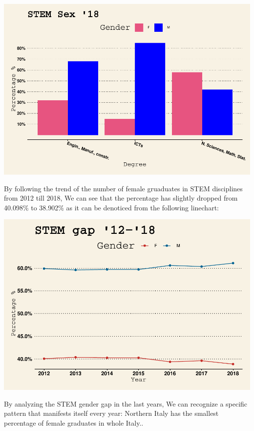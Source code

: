 \documentclass[
]{article}
\begin{document}
\includegraphics{g_gap_stem_files/figure-latex/unnamed-chunk-6-1.pdf}

By following the trend of the number of female gruaduates in STEM
disciplines from 2012 till 2018, We can see that the percentage has
slightly dropped from 40.098\% to 38.902\% as it can be denoticed from
the following linechart:

\includegraphics{g_gap_stem_files/figure-latex/unnamed-chunk-7-1.pdf}

By analyzing the STEM gender gap in the last years, We can recognize a
specific pattern that manifests itself every year: Northern Italy has
the smallest percentage of female graduates in whole Italy..
\end{document}
